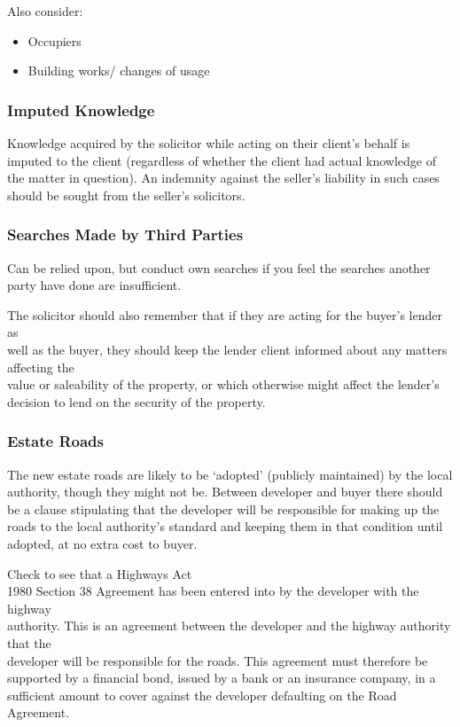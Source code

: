 \documentclass[
]{article}
\providecommand{\tightlist}{%
  \setlength{\itemsep}{0pt}\setlength{\parskip}{0pt}}
\begin{document}
Also consider:

\begin{itemize}
\tightlist
\item
  Occupiers
\item
  Building works/ changes of usage
\end{itemize}

\hypertarget{imputed-knowledge}{%
\subsubsection{Imputed Knowledge}\label{imputed-knowledge}}

Knowledge acquired by the solicitor while acting on their client's
behalf is imputed to the client (regardless of whether the client had
actual knowledge of the matter in question). An indemnity against the
seller's liability in such cases should be sought from the seller's
solicitors.

\hypertarget{searches-made-by-third-parties}{%
\subsubsection{Searches Made by Third
Parties}\label{searches-made-by-third-parties}}

Can be relied upon, but conduct own searches if you feel the searches
another party have done are insufficient.

The solicitor should also remember that if they are acting for the
buyer's lender as\\
well as the buyer, they should keep the lender client informed about any
matters affecting the\\
value or saleability of the property, or which otherwise might affect
the lender's decision to lend on the security of the property.

\hypertarget{estate-roads}{%
\subsubsection{Estate Roads}\label{estate-roads}}

The new estate roads are likely to be `adopted' (publicly maintained) by
the local authority, though they might not be. Between developer and
buyer there should be a clause stipulating that the developer will be
responsible for making up the roads to the local authority's standard
and keeping them in that condition until adopted, at no extra cost to
buyer.

Check to see that a Highways Act\\
1980 Section 38 Agreement has been entered into by the developer with
the highway\\
authority. This is an agreement between the developer and the highway
authority that the\\
developer will be responsible for the roads. This agreement must
therefore be supported by a financial bond, issued by a bank or an
insurance company, in a sufficient amount to cover against the developer
defaulting on the Road Agreement.
\end{document}
